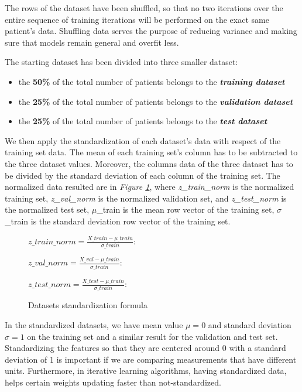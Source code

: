 \documentclass[12pt,a4paper,oneside]{article}
\begin{document}
	The rows of the dataset have been shuffled, so that no two iterations over the entire sequence of training iterations will be performed on the exact same patient's data. Shuffling data serves the purpose of reducing variance and making sure that models remain general and overfit less.
	
	The starting dataset has been divided into three smaller dataset:
	\begin{itemize}
		\item the \textbf{50\%} of the total number of patients belongs to the \textit{\textbf{training dataset}}
		\item the \textbf{25\%} of the total number of patients belongs to the \textit{\textbf{validation dataset}} 
		\item the \textbf{25\%} of the total number of patients belongs to the \textit{\textbf{test dataset}}
	\end{itemize}
	
	We then apply the standardization of each dataset's data with respect of the training set data. The mean of each training set's column has to be subtracted to the three dataset values. Moreover, the columns data of the three dataset has to be divided by the standard deviation of each column of the training set. The normalized data resulted are in \emph{Figure \ref{Figure 1}}, where \emph{z\_train\_norm} is the normalized training set, \emph{z\_val\_norm} is the normalized validation set, and \emph{z\_test\_norm} is the normalized test set, $\mu$\_train is the mean row vector of the training set, $\sigma$\_train is the standard deviation row vector of the training set.
	\begin{figure}
		\begin{center}
			$z\_train\_norm=\frac{X\_train-\mu\_train }{\sigma\_train }$:
			
			$z\_val\_norm=\frac{X\_val-\mu\_train }{\sigma\_train }$:
			
			$z\_test\_norm=\frac{X\_test-\mu\_train }{\sigma\_train }$:
		\end{center}
		
		\caption{Datasets standardization formula}
		\label{Figure 1}
	\end{figure} 
	
	In the standardized datasets, we have mean value $\mu=0$ and standard deviation $\sigma=1$ on the training set and a similar result for the validation and test set.
	Standardizing the features so that they are centered around 0 with a standard deviation of 1 is important if we are comparing measurements that have different units. Furthermore, in iterative learning algorithms, having standardized data, helps certain weights updating faster than not-standardized.
	
\end{document}
